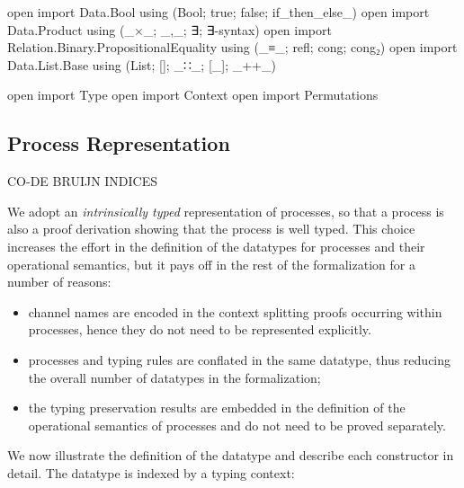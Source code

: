 \begin{code}[hide]
open import Data.Bool using (Bool; true; false; if_then_else_)
open import Data.Product using (_×_; _,_; ∃; ∃-syntax)
open import Relation.Binary.PropositionalEquality using (_≡_; refl; cong; cong₂)
open import Data.List.Base using (List; []; _∷_; [_]; _++_)

open import Type
open import Context
open import Permutations
\end{code}

\subsection{Process Representation}
\label{sec:process-agda}

CO-DE BRUIJN INDICES

We adopt an \emph{intrinsically typed} representation of processes, so that a
process is also a proof derivation showing that the process is well typed. This
choice increases the effort in the definition of the datatypes for processes and
their operational semantics, but it pays off in the rest of the formalization
for a number of reasons:

\begin{itemize}
\item channel names are encoded in the context splitting proofs occurring within
  processes, hence they do not need to be represented explicitly.
\item processes and typing rules are conflated in the same datatype, thus
  reducing the overall number of datatypes in the formalization;
\item the typing preservation results are embedded in the definition of the
  operational semantics of processes and do not need to be proved separately.
\end{itemize}

We now illustrate the definition of the  datatype and
describe each constructor in detail. The datatype is indexed by a typing
context:

